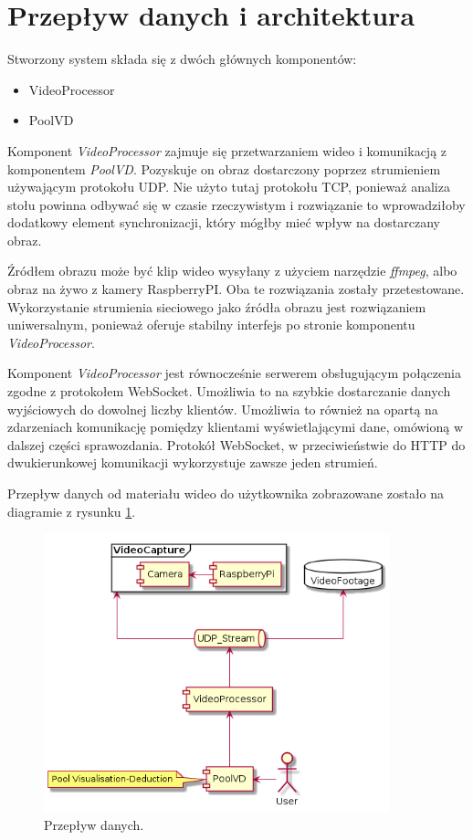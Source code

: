 \documentclass[12pt]{article}
\begin{document}
\section{Przepływ danych i architektura}

Stworzony system składa się z dwóch głównych komponentów:
\begin{itemize}[noitemsep]
    \item VideoProcessor
    \item PoolVD
\end{itemize}

Komponent \textit{VideoProcessor} zajmuje się przetwarzaniem wideo i komunikacją z komponentem \textit{PoolVD}. Pozyskuje on obraz dostarczony poprzez strumieniem używającym protokołu UDP. Nie użyto tutaj protokołu TCP, ponieważ analiza stołu powinna odbywać się w czasie rzeczywistym i rozwiązanie to wprowadziłoby dodatkowy element synchronizacji, który mógłby mieć wpływ na dostarczany obraz.

Źródłem obrazu może być klip wideo wysyłany z użyciem narzędzie \textit{ffmpeg}, albo obraz na żywo z kamery RaspberryPI. Oba te rozwiązania zostały przetestowane. Wykorzystanie strumienia sieciowego jako źródła obrazu jest rozwiązaniem uniwersalnym, ponieważ oferuje stabilny interfejs po stronie komponentu \textit{VideoProcessor}.

Komponent \textit{VideoProcessor} jest równocześnie serwerem obsługującym połączenia zgodne z protokołem WebSocket. Umożliwia to na szybkie dostarczanie danych wyjściowych do dowolnej liczby klientów. Umożliwia to również na opartą na zdarzeniach komunikację pomiędzy klientami wyświetlającymi dane, omówioną w dalszej części sprawozdania. Protokół WebSocket, w przeciwieństwie do HTTP do dwukierunkowej komunikacji wykorzystuje zawsze jeden strumień.

Przepływ danych od materiału wideo do użytkownika zobrazowane zostało na diagramie z rysunku \ref{dataflow}.


\begin{figure}[!htb]
    \centering
    \includegraphics[width=10cm]{./diagrams/out/data_flow.png}
    \caption{Przepływ danych.}
    \label{dataflow}
\end{figure}
\end{document}

